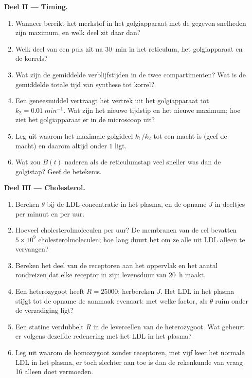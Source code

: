 \begin{problem}
\medskip
\noindent\textbf{Deel II --- Timing.}
\begin{enumerate}[resume]
  \item Wanneer bereikt het merkstof in het golgiapparaat met de
        gegeven snelheden zijn maximum, en welk deel zit daar dan?
  \item Welk deel van een puls zit na \qty{30}{min} in het reticulum,
        het golgiapparaat en de korrels?
  \item Wat zijn de gemiddelde verblijfstijden in de twee
        compartimenten? Wat is de gemiddelde totale tijd van synthese
        tot korrel?
  \item Een geneesmiddel vertraagt het vertrek uit het golgiapparaat
        tot $k_{2} = \qty{0.01}{min^{-1}}$. Wat zijn het nieuwe
        tijdstip en het nieuwe maximum; hoe ziet het golgiapparaat er
        in de microscoop uit?
  \item Leg uit waarom het maximale golgideel $k_{1}/k_{2}$ tot een
        macht is (geef de macht) en daarom altijd onder $1$ ligt.
  \item Wat zou $B(t)$ naderen als de reticulumstap veel sneller was
        dan de golgistap? Geef de betekenis.
\end{enumerate}

\medskip
\noindent\textbf{Deel III --- Cholesterol.}
\begin{enumerate}[resume]
  \item Bereken $\theta$ bij de LDL-concentratie in het plasma, en de
        opname $J$ in deeltjes per minuut en per uur.
  \item Hoeveel cholesterolmoleculen per uur? De membranen van de cel
        bevatten $5\times 10^{9}$ cholesterolmoleculen; hoe lang duurt
        het om ze alle uit LDL alleen te vervangen?
  \item Bereken het deel van de receptoren aan het oppervlak en het
        aantal rondreizen dat elke receptor in zijn levensduur van
        \qty{20}{h} maakt.
  \item Een heterozygoot heeft $R = \num{25000}$: herbereken $J$. Het
        LDL in het plasma stijgt tot de opname de aanmaak evenaart: met
        welke factor, als $\theta$ ruim onder de verzadiging ligt?
  \item Een statine verdubbelt $R$ in de levercellen van de
        heterozygoot. Wat gebeurt er volgens dezelfde redenering met
        het LDL in het plasma?
  \item Leg uit waarom de homozygoot zonder receptoren, met vijf keer
        het normale LDL in het plasma, er toch slechter aan toe is dan
        de rekenkunde van vraag 16 alleen doet vermoeden.
\end{enumerate}


\end{problem}
